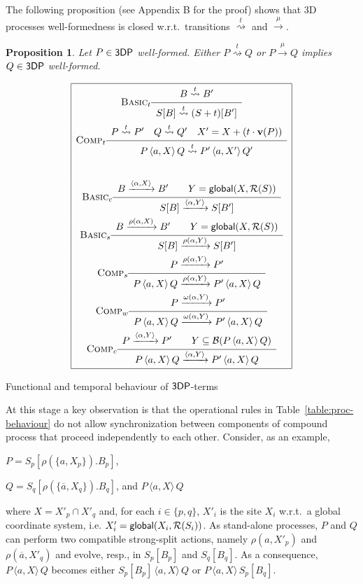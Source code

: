 \documentclass[11pt]{article}
\newcommand{\reference}{{\sf global}}
\newcommand{\proc}{\sf{3DP}}
\newcommand{\unionc}[1]{\,\langle #1 \rangle\,}
\def\sos#1#2{{\def\arraystretch{1.6}\begin{array}{c}#1\\\hline
#2\end{array}}}
\newcommand{\nar}[1]{\xrightarrow{#1}}
\newcommand{\wnar}[1]{\stackrel{#1}{\rightsquigarrow}}
\def\name#1{\mbox{\sc #1}}
\newcommand{\boundary}[1]{\ensuremath{{\cal B}(#1)}}
\newcommand{\velocity}[1]{{\bf v}(#1)}
\newcommand{\referencepoint}[1]{\ensuremath{{\cal R}(#1)}}
\newtheorem{proposition}{Proposition}
\begin{document}
The following proposition (see Appendix B for the proof) shows that 3D processes
well-formedness is closed w.r.t.\ transitions $\wnar{t}$ and $\nar{\mu}$.

\begin{proposition}\label{prop:closure-3d}
Let $P \in \proc$ well-formed. Either $P \wnar{t} Q$ or $P \nar{\mu} Q$ implies $Q \in \proc$
well-formed.
\end{proposition}


\begin{table}[tbp]
$$
\begin{array}{|c|}
\hline
\name{Basic$_t$}\sos{ B \wnar{t} B'}{
S[B] \wnar{t} (S+t)[B']} \\
\name{Comp$_t$} \sos{P \wnar{t} P' \quad Q \wnar{t} Q'  \quad X' = X + (t \cdot \velocity{P})}
{P \unionc{a, X} Q \wnar{t} P' \unionc{a, X'} Q'}\\ \\
\name{Basic$_{c}$}\sos{B \nar{\langle \alpha, X \rangle} B' \qquad Y  = \reference(X, \referencepoint{S})}
{ S[B] \nar{\langle \alpha, Y \rangle} S[B']} \\
\name{Basic$_{s}$}\sos{B \nar{\rho(\alpha, X)} B' \qquad Y = \reference(X, \referencepoint{S})}
{ S[B] \nar{\rho(\alpha, Y)} S[B']}\\
 \name{Comp$_s$} \sos{P \nar{\rho(\alpha, Y)} P'} {P
\unionc{a, X} Q \nar{\rho(\alpha, Y)} P' \unionc{a, X} Q} \\
\name{Comp$_w$} \sos{P \nar{\omega(\alpha, Y)} P'} {P
\unionc{a, X} Q \nar{\omega(\alpha, Y)} P' \unionc{a, X} Q} \\
\name{Comp$_{c}$} \sos{P \nar{\langle \alpha, Y \rangle } P' \qquad Y \subseteq \boundary{P
\unionc{a,X} Q}} {P \unionc{a, X} Q \nar{\langle \alpha, Y \rangle} P'
\unionc{a, X} Q}\\
\hline
\end{array}
$$
\caption{Functional and temporal behaviour of $\proc$-terms}
\label{table:proc-behaviour}
\end{table}

At this stage a key observation is that the operational rules in Table~\ref{table:proc-behaviour} do
not allow synchronization between components of compound process that proceed independently to each
other. Consider, as an example,
\begin{description}
\item $P = S_p [\rho(\{a, X_p\}). B_p]$,
\item $Q =S_q[\rho(\{\overline{a},X_q\}). B_q]$, and  $P\unionc{a,X} Q$
\end{description}
where $X = X'_p \cap X'_q$ and, for each $i \in \{p,q\}$, $X'_{i}$ is the site $X_i$ w.r.t.\ a global coordinate system, i.e. $X'_{i} = \reference(X_i, \referencepoint{S_i})$. As stand-alone processes, $P$ and $Q$ can perform two compatible strong-split actions, namely $\rho(a, X'_p)$ and $\rho(\overline{a},X'_q)$ and evolve, resp., in $S_p[B_p]$ and $S_q[B_q]$. As a consequence, $P \unionc{a,X} Q$ becomes either $S_p[B_p] \unionc{a,X} Q$ or $P \unionc{a,X} S_p[B_q]$.
\end{document}
